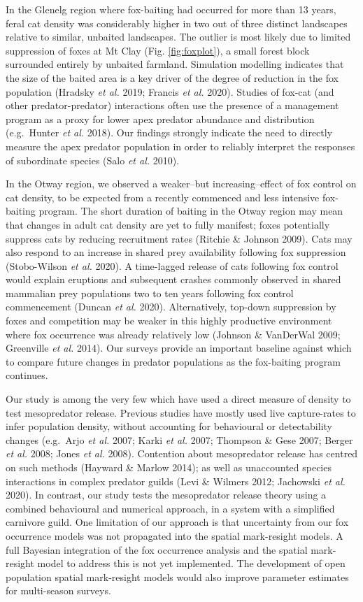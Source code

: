 \documentclass[]{elsarticle} %
\begin{document}
In the Glenelg region where fox-baiting had occurred for more than 13 years, feral cat density was considerably higher in two out of three distinct landscapes relative to similar, unbaited landscapes. The outlier is most likely due to limited suppression of foxes at Mt Clay (Fig. \ref{fig:foxplot}), a small forest block surrounded entirely by unbaited farmland. Simulation modelling indicates that the size of the baited area is a key driver of the degree of reduction in the fox population (Hradsky \emph{et al.} 2019; Francis \emph{et al.} 2020). Studies of fox-cat (and other predator-predator) interactions often use the presence of a management program as a proxy for lower apex predator abundance and distribution (e.g.~Hunter \emph{et al.} 2018). Our findings strongly indicate the need to directly measure the apex predator population in order to reliably interpret the responses of subordinate species (Salo \emph{et al.} 2010).

In the Otway region, we observed a weaker--but increasing--effect of fox control on cat density, to be expected from a recently commenced and less intensive fox-baiting program. The short duration of baiting in the Otway region may mean that changes in adult cat density are yet to fully manifest; foxes potentially suppress cats by reducing recruitment rates (Ritchie \& Johnson 2009). Cats may also respond to an increase in shared prey availability following fox suppression (Stobo-Wilson \emph{et al.} 2020). A time-lagged release of cats following fox control would explain eruptions and subsequent crashes commonly observed in shared mammalian prey populations two to ten years following fox control commencement (Duncan \emph{et al.} 2020). Alternatively, top-down suppression by foxes and competition may be weaker in this highly productive environment where fox occurrence was already relatively low (Johnson \& VanDerWal 2009; Greenville \emph{et al.} 2014). Our surveys provide an important baseline against which to compare future changes in predator populations as the fox-baiting program continues.

Our study is among the very few which have used a direct measure of density to test mesopredator release. Previous studies have mostly used live capture-rates to infer population density, without accounting for behavioural or detectability changes (e.g.~Arjo \emph{et al.} 2007; Karki \emph{et al.} 2007; Thompson \& Gese 2007; Berger \emph{et al.} 2008; Jones \emph{et al.} 2008). Contention about mesopredator release has centred on such methods (Hayward \& Marlow 2014); as well as unaccounted species interactions in complex predator guilds (Levi \& Wilmers 2012; Jachowski \emph{et al.} 2020). In contrast, our study tests the mesopredator release theory using a combined behavioural and numerical approach, in a system with a simplified carnivore guild. One limitation of our approach is that uncertainty from our fox occurrence models was not propagated into the spatial mark-resight models. A full Bayesian integration of the fox occurrence analysis and the spatial mark-resight model to address this is not yet implemented. The development of open population spatial mark-resight models would also improve parameter estimates for multi-season surveys.
\end{document}
